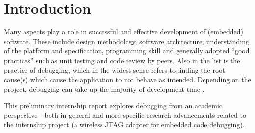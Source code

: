 

\section{Introduction}

Many aspects play a role in successful and effective development of (embedded) software. These include design methodology, software architecture, understanding of the platform and specification, programming skill and generally adopted ``good practices'' such as unit testing and code review by peers. Also in the list is the practice of debugging, which in the widest sense refers to finding the root cause(s) which cause the application to not behave as intended. Depending on the project, debugging can take up the majority of development time .

This preliminary internship report explores debugging from an academic perspective - both in general and more specific research advancements related to the internship project (a wireless JTAG adapter for embedded code debugging). 



